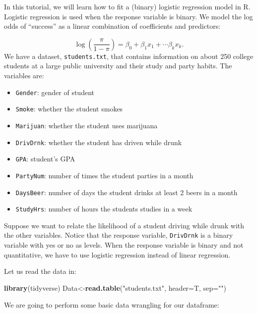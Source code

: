 \documentclass[
]{book}
\newenvironment{Shaded}{\begin{snugshade}}{\end{snugshade}}
\newcommand{\AttributeTok}[1]{\textcolor[rgb]{0.13,0.29,0.53}{#1}}
\newcommand{\FunctionTok}[1]{\textcolor[rgb]{0.13,0.29,0.53}{\textbf{#1}}}
\newcommand{\NormalTok}[1]{#1}
\newcommand{\OtherTok}[1]{\textcolor[rgb]{0.56,0.35,0.01}{#1}}
\newcommand{\StringTok}[1]{\textcolor[rgb]{0.31,0.60,0.02}{#1}}
\providecommand{\tightlist}{%
  \setlength{\itemsep}{0pt}\setlength{\parskip}{0pt}}
\begin{document}
In this tutorial, we will learn how to fit a (binary) logistic regression model in R. Logistic regression is used when the response variable is binary. We model the log odds of ``success'' as a linear combination of coefficients and predictors:

\[
\log(\frac{\pi}{1-\pi}) = \beta_0 + \beta_1 x_1 + \cdots \beta_{k} x_{k}.
\]
We have a dataset, \texttt{students.txt}, that contains information on about 250 college students at a large public university and their study and party habits. The variables are:

\begin{itemize}
\tightlist
\item
  \texttt{Gender}: gender of student
\item
  \texttt{Smoke}: whether the student smokes
\item
  \texttt{Marijuan}: whether the student uses marijuana
\item
  \texttt{DrivDrnk}: whether the student has driven while drunk
\item
  \texttt{GPA}: student's GPA
\item
  \texttt{PartyNum}: number of times the student parties in a month
\item
  \texttt{DaysBeer}: number of days the student drinks at least 2 beers in a month
\item
  \texttt{StudyHrs}: number of hours the students studies in a week
\end{itemize}

Suppose we want to relate the likelihood of a student driving while drunk with the other variables. Notice that the response variable, \texttt{DrivDrnk} is a binary variable with yes or no as levels. When the response variable is binary and not quantitative, we have to use logistic regression instead of linear regression.

Let us read the data in:

\begin{Shaded}
\begin{Highlighting}[]
\FunctionTok{library}\NormalTok{(tidyverse)}
\NormalTok{Data}\OtherTok{\textless{}{-}}\FunctionTok{read.table}\NormalTok{(}\StringTok{"students.txt"}\NormalTok{, }\AttributeTok{header=}\NormalTok{T, }\AttributeTok{sep=}\StringTok{""}\NormalTok{)}
\end{Highlighting}
\end{Shaded}

We are going to perform some basic data wrangling for our dataframe:
\end{document}
